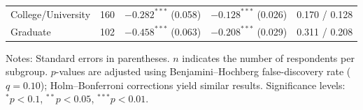 \documentclass[doublespacing]{utdthesis}
\begin{document}
\begin{table}[!htbp]
\begin{threeparttable}
\begin{tabular}{l r c c c}
\quad College/University  & 160 & $-0.282^{***}$ (0.058) & $-0.128^{***}$ (0.026) & 0.170 / 0.128 \\
\quad Graduate            & 102 & $-0.458^{***}$ (0.063) & $-0.208^{***}$ (0.029) & 0.311 / 0.208 \\
\bottomrule
\end{tabular}
\begin{tablenotes}[flushleft]
\footnotesize
\item Notes: Standard errors in parentheses. $n$ indicates the number of respondents per subgroup.
$p$-values are adjusted using Benjamini--Hochberg false-discovery rate ($q=0.10$); Holm--Bonferroni corrections yield similar results.
Significance levels: $^{*}p<0.1$, $^{**}p<0.05$, $^{***}p<0.01$.
\end{tablenotes}
\end{threeparttable}
\end{table}
\end{document}
